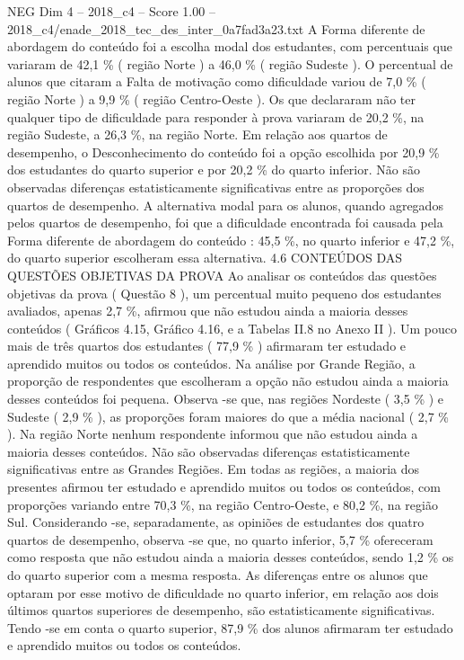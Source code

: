 \begin{textsample}{NEG Dim 4 – 2018\_c4 – Score 1.00 – 2018\_c4/enade\_2018\_tec\_des\_inter\_0a7fad3a23.txt}
A Forma diferente de abordagem do conteúdo foi a escolha modal dos estudantes, com percentuais que variaram de 42,1 \% ( região Norte ) a 46,0 \% ( região Sudeste ).
O percentual de alunos que citaram a Falta de motivação como dificuldade variou de 7,0 \% ( região Norte ) a 9,9 \% ( região Centro-Oeste ).
Os que declararam não ter qualquer tipo de dificuldade para responder à prova variaram de 20,2 \%, na região Sudeste, a 26,3 \%, na região Norte.
Em relação aos quartos de desempenho, o Desconhecimento do conteúdo foi a opção escolhida por 20,9 \% dos estudantes do quarto superior e por 20,2 \% do quarto inferior.
Não são observadas diferenças estatisticamente significativas entre as proporções dos quartos de desempenho.
A alternativa modal para os alunos, quando agregados pelos quartos de desempenho, foi que a dificuldade encontrada foi causada pela Forma diferente de abordagem do conteúdo : 45,5 \%, no quarto inferior e 47,2 \%, do quarto superior escolheram essa alternativa. 4.6 CONTEÚDOS DAS QUESTÕES OBJETIVAS DA PROVA Ao analisar os conteúdos das questões objetivas da prova ( Questão 8 ), um percentual muito pequeno dos estudantes avaliados, apenas 2,7 \%, afirmou que não estudou ainda a maioria desses conteúdos ( Gráficos 4.15, Gráfico 4.16, e a Tabelas II.8 no Anexo II ).
Um pouco mais de três quartos dos estudantes ( 77,9 \% ) afirmaram ter estudado e aprendido muitos ou todos os conteúdos.
Na análise por Grande Região, a proporção de respondentes que escolheram a opção não estudou ainda a maioria desses conteúdos foi pequena.
Observa -se que, nas regiões Nordeste ( 3,5 \% ) e Sudeste ( 2,9 \% ), as proporções foram maiores do que a média nacional ( 2,7 \% ).
Na região Norte nenhum respondente informou que não estudou ainda a maioria desses conteúdos.
Não são observadas diferenças estatisticamente significativas entre as Grandes Regiões.
Em todas as regiões, a maioria dos presentes afirmou ter estudado e aprendido muitos ou todos os conteúdos, com proporções variando entre 70,3 \%, na região Centro-Oeste, e 80,2 \%, na região Sul.
Considerando -se, separadamente, as opiniões de estudantes dos quatro quartos de desempenho, observa -se que, no quarto inferior, 5,7 \% ofereceram como resposta que não estudou ainda a maioria desses conteúdos, sendo 1,2 \% os do quarto superior com a mesma resposta.
As diferenças entre os alunos que optaram por esse motivo de dificuldade no quarto inferior, em relação aos dois últimos quartos superiores de desempenho, são estatisticamente significativas.
Tendo -se em conta o quarto superior, 87,9 \% dos alunos afirmaram ter estudado e aprendido muitos ou todos os conteúdos.

\end{textsample}
